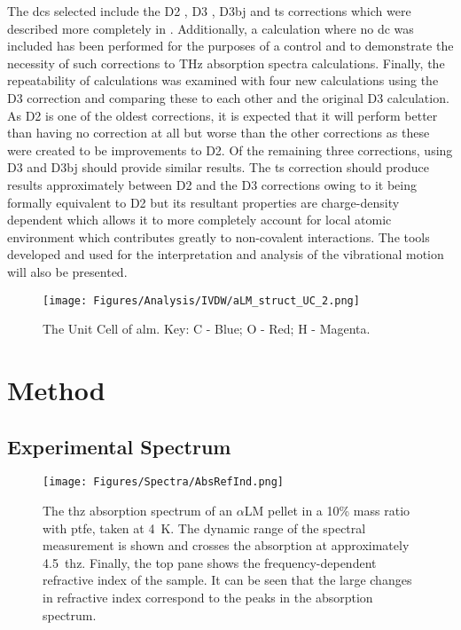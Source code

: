 The \acrshort{dc}s selected include the D2 \DIFdelbegin \DIFdel{~}\DIFdelend \cite{Grimme2006}, D3 \DIFdelbegin \DIFdel{~}\DIFdelend \cite{Grimme2010}, D3\acrshort{bj} \DIFdelbegin \DIFdel{~}\DIFdelend \cite{Becke2005} and \acrshort{ts} \DIFdelbegin \DIFdel{~}\DIFdelend \cite{Tkatchenko2009} corrections which were described more completely in . Additionally, a calculation where no \acrshort{dc} was included has been performed for the purposes of a control and to demonstrate the necessity of such corrections to THz absorption spectra calculations. Finally, the repeatability of calculations was examined with four new calculations using the D3 correction and comparing these to each other and the original D3 calculation. As D2 is one of the oldest corrections, it is expected that it will perform better than having no correction at all but worse than the other corrections as these were created to be improvements to D2. Of the remaining three corrections, using D3 and D3\acrshort{bj} should provide similar results. The \acrshort{ts} correction should produce results approximately between D2 and the D3 corrections owing to it being formally equivalent to D2 but its resultant properties are charge\nobreakdash-density dependent which allows it to more completely account for local atomic environment which contributes greatly to non-covalent interactions. The tools developed and used for the interpretation and analysis of the vibrational motion will also be presented.

\begin{figure}[t]
    \centering
    \texttt{[image: Figures/Analysis/IVDW/aLM\_struct\_UC\_2.png]}
    \captionsetup{font = footnotesize, justification = centering}
    \caption[The Unit Cell of \(\alpha\)-Lactose Monohydrate]{The Unit Cell of \acrshort{alm}. Key: C - Blue; O - Red; H - Magenta.}
    \label{fig:aLM_Structure}
\end{figure}

\section{Method}
\subsection{Experimental Spectrum}
\begin{figure}[bh!]
    \centering
    \texttt{[image: Figures/Spectra/AbsRefInd.png]}
    \captionsetup{font = footnotesize, justification = centering}
    \caption[The THz Absorption Spectrum and Refractive Index of \(\alpha\)-Lactose Monohydrate]{The \acrshort{thz} absorption spectrum of an ${\alpha}$LM pellet in a 10\% mass ratio with \acrshort{ptfe}, taken at \SI{4}{K}. The dynamic range of the spectral measurement is shown and crosses the absorption at approximately \SI{4.5}{\acrshort{thz}}. Finally, the top pane shows the frequency\nobreakdash-dependent refractive index of the sample. It can be seen that the large changes in refractive index correspond to the peaks in the absorption spectrum.}
    \label{fig:AbsRefInd}
\end{figure}

